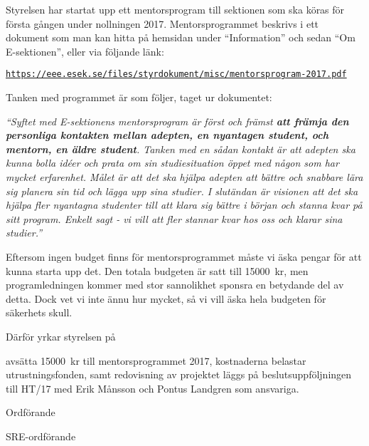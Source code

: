 \documentclass[../_main/handlingar.tex]{subfiles}
\begin{document}

Styrelsen har startat upp ett mentorsprogram till sektionen som ska köras för första gången under nollningen 2017. Mentorsprogrammet beskrivs i ett dokument som man kan hitta på hemsidan under ``Information'' och sedan ``Om E-sektionen'', eller via följande länk:

\href{https://eee.esek.se/files/styrdokument/misc/mentorsprogram-2017.pdf}{\texttt{https://eee.esek.se/files/styrdokument/misc/mentorsprogram-2017.pdf}}

Tanken med programmet är som följer, taget ur dokumentet:

\textit{``Syftet med E-sektionens mentorsprogram är först och främst \textbf{att främja den personliga kontakten mellan adepten, en nyantagen student, och mentorn, en äldre student}.
Tanken med en sådan kontakt är att adepten ska kunna bolla idéer och prata om sin studiesituation öppet med någon som har mycket erfarenhet.
Målet är att det ska hjälpa adepten att bättre och snabbare lära sig planera sin tid och lägga upp sina studier.
I slutändan är visionen att det ska hjälpa fler nyantagna studenter till att klara sig bättre i början och stanna kvar på sitt program.
Enkelt sagt - vi vill att fler stannar kvar hos oss och klarar sina studier.''}

Eftersom ingen budget finns för mentorsprogrammet måste vi äska pengar för att kunna starta upp det. Den totala budgeten är satt till \SI{15000}{kr}, men programledningen kommer med stor sannolikhet sponsra en betydande del av detta. Dock vet vi inte ännu hur mycket, så vi vill äska hela budgeten för säkerhets skull.

Därför yrkar styrelsen på

\begin{attsatser}
    \att avsätta \SI{15000}{kr} till mentorsprogrammet 2017,
    \att kostnaderna belastar utrustningsfonden, samt
    \att redovisning av projektet läggs på beslutsuppföljningen till HT/17 med Erik Månsson och Pontus Landgren som ansvariga.
\end{attsatser}

\begin{signatures}{2}
    \ist
    \signature{\ordf}{Ordförande}
    \signature{\sreordf}{SRE-ordförande}
\end{signatures}
\end{document}
